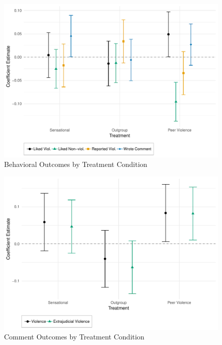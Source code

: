 \documentclass[12pt, letterpaper]{article}
\begin{document}
\begin{figure}[!htbp]
  \centering
  \caption{Behavioral Outcomes by Treatment Condition}
  \includegraphics[width=.835\textwidth]{figures/ATE_behavioral.pdf}
\end{figure}


\begin{figure}[!htbp]
  \centering
  \caption{Comment Outcomes by Treatment Condition}
  \includegraphics[width=.835\textwidth]{figures/ATE_com_heckman.pdf}
\end{figure}
\end{document}

